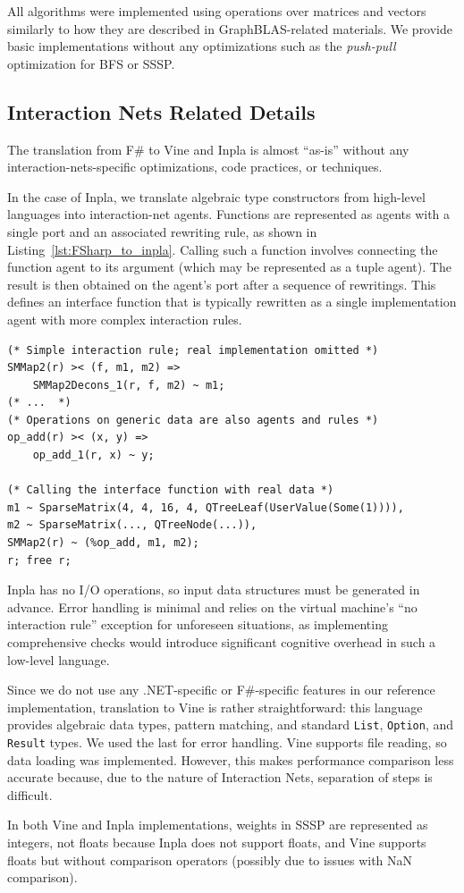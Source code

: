 All algorithms were implemented using operations over matrices and vectors similarly to how they are described in GraphBLAS-related materials.
We provide basic implementations without any optimizations such as the \emph{push-pull} optimization for BFS or SSSP.

\subsection{Interaction Nets Related Details}

The translation from F\# to Vine and Inpla is almost ``as-is'' without any interaction-nets-specific optimizations, code practices, or techniques.

In the case of Inpla, we translate algebraic type constructors from high-level languages into interaction-net agents. Functions are represented as agents with a single port and an associated rewriting rule, as shown in Listing~\ref{lst:FSharp_to_inpla}.
Calling such a function involves connecting the function agent to its argument (which may be represented as a tuple agent).
The result is then obtained on the agent's port after a sequence of rewritings. This defines an interface function that is typically rewritten as a single implementation agent with more complex interaction rules.

\begin{listing}[H]
\begin{verbatim}
(* Simple interaction rule; real implementation omitted *)
SMMap2(r) >< (f, m1, m2) =>
    SMMap2Decons_1(r, f, m2) ~ m1;
(* ...  *)
(* Operations on generic data are also agents and rules *)
op_add(r) >< (x, y) =>
    op_add_1(r, x) ~ y;

(* Calling the interface function with real data *)
m1 ~ SparseMatrix(4, 4, 16, 4, QTreeLeaf(UserValue(Some(1)))),
m2 ~ SparseMatrix(..., QTreeNode(...)),
SMMap2(r) ~ (%op_add, m1, m2);
r; free r;
\end{verbatim}
\caption{An example of top-level functions and constructors translation result}
\label{lst:FSharp_to_inpla}
\end{listing}

Inpla has no I/O operations, so input data structures must be generated in advance.
Error handling is minimal and relies on the virtual machine's ``no interaction rule'' exception for unforeseen situations, as implementing comprehensive checks would introduce significant cognitive overhead in such a low-level language.

Since we do not use any .NET-specific or F\#-specific features in our reference implementation, translation to Vine is rather straightforward: this language provides algebraic data types, pattern matching, and standard \verb|List|, \verb|Option|, and \verb|Result| types.
We used the last for error handling.
Vine supports file reading, so data loading was implemented. 
However, this makes performance comparison less accurate because, due to the nature of Interaction Nets, separation of steps is difficult.

In both Vine and Inpla implementations, weights in SSSP are represented as integers, not floats because Inpla does not support floats, and Vine supports floats but without comparison operators (possibly due to issues with NaN comparison).